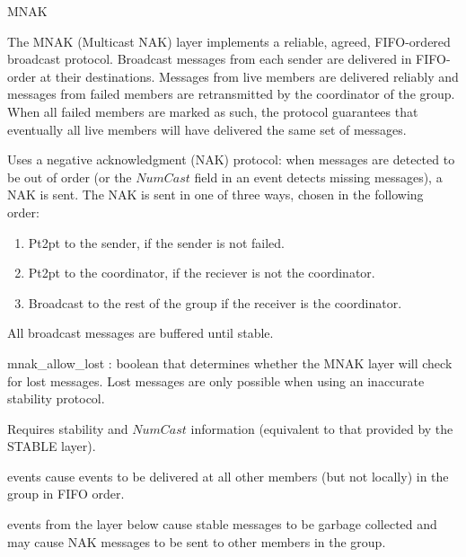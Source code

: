 \begin{Layer}{MNAK}

The MNAK (Multicast NAK) layer implements a reliable, agreed, FIFO-ordered
broadcast protocol.  Broadcast messages from each sender are delivered in
FIFO-order at their destinations.  Messages from live members are delivered
reliably and messages from failed members are retransmitted by the coordinator
of the group.  When all failed members are marked as such, the protocol
guarantees that eventually all live members will have delivered the same set of
messages.

\begin{Protocol}
Uses a negative acknowledgment (NAK) protocol: when messages are detected
to be out of order (or the $NumCast$ field in an  event detects
missing messages), a NAK is sent.  The NAK is sent in one of three ways,
chosen in the following order:
\begin{enumerate}
\item Pt2pt to the sender, if the sender is not failed.
\item Pt2pt to the coordinator, if the reciever is not the coordinator.
\item Broadcast to the rest of the group if the receiver is the
  coordinator.
\end{enumerate}
All broadcast messages are buffered until stable.
\end{Protocol}

\begin{Parameters}
\item mnak\_allow\_lost : boolean that determines whether the MNAK layer will
check for lost messages.  Lost messages are only possible when using an
inaccurate stability protocol.
\end{Parameters}

\begin{Properties}
\item
Requires stability and $NumCast$ information (equivalent to that provided
by the STABLE layer).
\item
{} events cause  events to be delivered at all other members
(but not locally) in the group in FIFO order.
\item
{} events from the layer below cause stable messages to be garbage
collected and may cause NAK messages to be sent to other members in the
group.
\end{Properties}

\begin{Sources}
\end{Sources}


\end{Layer}
